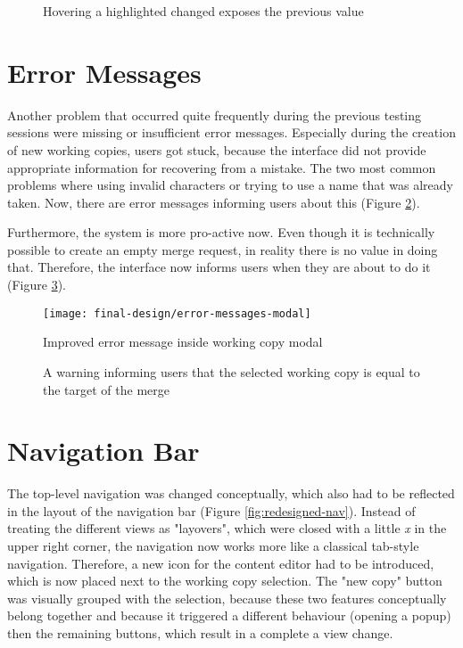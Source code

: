 \begin{figure}[h!]
 \centering
 \caption{Hovering a highlighted changed exposes the previous value}
 \label{fig:hover-changed-text}
\end{figure}



\section{Error Messages}
Another problem that occurred quite frequently during the previous testing sessions were missing or insufficient error messages. Especially during the creation of new working copies, users got stuck, because the interface did not provide appropriate information for recovering from a mistake. The two most common problems where using invalid characters or trying to use a name that was already taken. Now, there are error messages informing users about this (Figure \ref{fig:improv-error-messages}).

Furthermore, the system is more pro-active now. Even though it is technically possible to create an empty merge request, in reality there is no value in doing that. Therefore, the interface now informs users when they are about to do it (Figure \ref{fig:empty-merge-warning}).

\begin{figure}[h!]
 \centering
 \texttt{[image: final-design/error-messages-modal]}
 \caption{Improved error message inside working copy modal}
 \label{fig:improv-error-messages}
\end{figure}

\begin{figure}[h!]
 \centering
 \caption{A warning informing users that the selected working copy is equal to the target of the merge}
 \label{fig:empty-merge-warning}
\end{figure}

\section{Navigation Bar}
The top-level navigation was changed conceptually, which also had to be reflected in the layout of the navigation bar (Figure \ref{fig:redesigned-nav}). Instead of treating the different views as "layovers", which were closed with a little \textit{x} in the upper right corner, the navigation now works more like a classical tab-style navigation. Therefore, a new icon for the content editor had to be introduced, which is now placed next to the working copy selection. The "new copy" button was visually grouped with the selection, because these two features conceptually belong together and because it triggered a different behaviour (opening a popup) then the remaining buttons, which result in a complete a view change.

